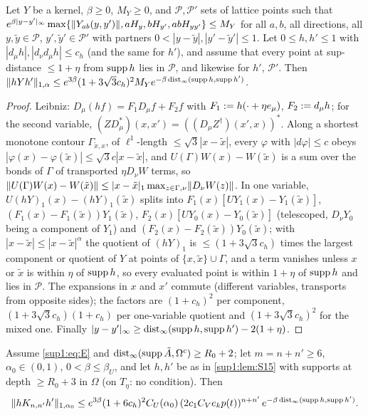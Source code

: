 \begin{lemma}\label{sup1:lem:S15}
Let $Y$ be a kernel, $\beta\ge0$, $M_Y\ge0$, and $\mathcal P,\mathcal P'$ sets of lattice points such that $e^{\beta|y-y'|_\infty}\max\{\lVert Y_{ab}(y,y')\rVert,aH_y,bH_{y'},abH_{yy'}\}\le M_Y$ for all $a,b$, all directions, all $y,\tilde y\in\mathcal P$, $y',\tilde y'\in\mathcal P'$ with partners $0<|y-\tilde y|,|y'-\tilde y'|\le1$. Let $0\le h,h'\le1$ with $|d_\mu h|,|d_\nu d_\mu h|\le c_h$ (and the same for $h'$), and assume that every point at sup-distance $\le1+\eta$ from $\operatorname{supp} h$ lies in $\mathcal P$, and likewise for $h'$, $\mathcal P'$. Then $\lVert hYh'\rVert_{1,\alpha}\le e^{3\beta}(1+3\sqrt3c_h)^2M_Ye^{-\beta\operatorname{dist}_\infty(\operatorname{supp} h,\operatorname{supp} h')}$.
\end{lemma}

\begin{proof}
Leibniz: $D_\mu(hf)=F_1D_\mu f+F_2f$ with $F_1:= h(\cdot+\eta e_\mu)$, $F_2:= d_\mu h$; for the second variable, $(ZD_\mu^*)(x,x')=((D_\mu Z^\dagger)(x',x))^*$. Along a shortest monotone contour $\Gamma_{\tilde x,x}$, of $\ell^1$-length $\le\sqrt3|x-\tilde x|$, every $\varphi$ with $|d\varphi|\le c$ obeys $|\varphi(x)-\varphi(\tilde x)|\le\sqrt3c|x-\tilde x|$, and $U(\Gamma)W(x)-W(\tilde x)$ is a sum over the bonds of $\Gamma$ of transported $\eta D_\nu W$ terms, so $\lVert U(\Gamma)W(x)-W(\tilde x)\rVert\le|x-\tilde x|_1\max_{z\in\Gamma,\nu}\lVert D_\nu W(z)\rVert$. In one variable, $U(hY)_1(x)-(hY)_1(\tilde x)$ splits into $F_1(x)[UY_1(x)-Y_1(\tilde x)]$, $(F_1(x)-F_1(\tilde x))Y_1(\tilde x)$, $F_2(x)[UY_0(x)-Y_0(\tilde x)]$ (telescoped, $D_\nu Y_0$ being a component of $Y_1$) and $(F_2(x)-F_2(\tilde x))Y_0(\tilde x)$; with $|x-\tilde x|\le|x-\tilde x|^\alpha$ the quotient of $(hY)_1$ is $\le(1+3\sqrt3c_h)$ times the largest component or quotient of $Y$ at points of $\{x,\tilde x\}\cup\Gamma$, and a term vanishes unless $x$ or $\tilde x$ is within $\eta$ of $\operatorname{supp} h$, so every evaluated point is within $1+\eta$ of $\operatorname{supp} h$ and lies in $\mathcal P$. The expansions in $x$ and $x'$ commute (different variables, transports from opposite sides); the factors are $(1+c_h)^2$ per component, $(1+3\sqrt3c_h)(1+c_h)$ per one-variable quotient and $(1+3\sqrt3c_h)^2$ for the mixed one. Finally $|y-y'|_\infty\ge\operatorname{dist}_\infty(\operatorname{supp} h,\operatorname{supp} h')-2(1+\eta)$.
\end{proof}

\begin{corollary}[{\cite[(2.5)]{Ba3} for \cite[(1.16)]{Ba3} at $L=5$}]\label{sup1:cor:S16}
Assume \eqref{sup1:eq:E} and $\operatorname{dist}_\infty(\operatorname{supp}\tilde A,\Omega^c)\ge R_0+2$; let $m=n+n'\ge6$, $\alpha_0\in(0,1)$, $0<\beta\le\beta_U$, and let $h,h'$ be as in \cref{sup1:lem:S15} with supports at depth $\ge R_0+3$ in $\Omega$ (on $T_\eta$: no condition). Then
\[
\lVert hK_{n,n'}h'\rVert_{1,\alpha_0}\le e^{3\beta}(1+6c_h)^2C_U(\alpha_0)\,(2c_1C_Ve_kp(t))^{n+n'}\,e^{-\beta\operatorname{dist}_\infty(\operatorname{supp} h,\operatorname{supp} h')}.
\]
\end{corollary}

